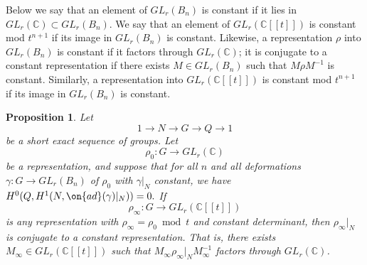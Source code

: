 \documentclass[12 pt]{amsart}
\theoremstyle{plain}
\newtheorem{proposition}[subsubsection]{Proposition}
\theoremstyle{definition}
\theoremstyle{remark}
\numberwithin{equation}{section}
\begin{document}
Below we say that an element of $GL_r(B_n)$ is constant if it lies in $GL_r(\mathbb{C})\subset GL_r(B_n)$. We say that an element of $GL_r(\mathbb{C}[[t]])$ is constant mod $t^{n+1}$ if its image in $GL_r(B_n)$ is constant. Likewise, a representation $\rho$ into $GL_r(B_n)$ is constant if it factors through $GL_r(\mathbb{C})$; it is conjugate to a constant representation if there exists $M\in GL_r(B_n)$ such that $M\rho M^{-1}$ is constant. Similarly, a representation into $GL_r(\mathbb{C}[[t]])$ is constant mod $t^{n+1}$ if its image in $GL_r(B_n)$ is constant.
\begin{proposition}\label{prop:stacky-split-constancy}
	Let $$1\to N\to G\to Q\to 1$$ be a short exact sequence of groups. Let $$\rho_0: G\to GL_r(\mathbb{C})$$ be a representation, and suppose that for all $n$ and all deformations $\gamma: G\to GL_r(B_n)$ of $\rho_0$ with $\gamma|_N$ constant, we have $H^0(Q, H^1(N, \on{ad}(\gamma)|_N))=0.$ If $$\rho_\infty: G\to GL_r(\mathbb{C}[[t]])$$ is any representation with $\rho_\infty=\rho_0\bmod t$ and constant determinant, then $\rho_\infty|_N$ is conjugate to a constant representation. That is, there exists $M_\infty\in GL_r(\mathbb{C}[[t]])$ such that $M_\infty\rho_\infty|_NM_\infty^{-1}$ factors through $GL_r(\mathbb{C})$.
\end{proposition}
\end{document}
